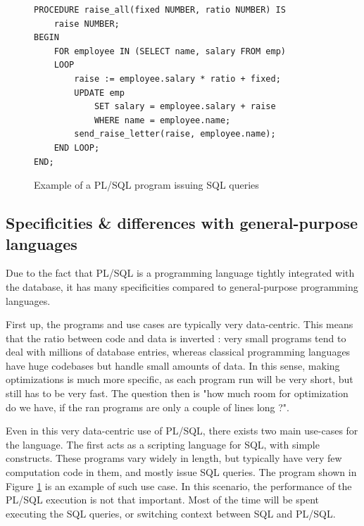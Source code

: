 \documentclass[twoside,11pt,a4paper]{article}
\newcommand{\todo}[1]{\textit{TODO: #1}}
\begin{document}

\begin{figure}[t]
	\begin{lstlisting}[style=PLSQL]
PROCEDURE raise_all(fixed NUMBER, ratio NUMBER) IS
	raise NUMBER;
BEGIN
	FOR employee IN (SELECT name, salary FROM emp)
	LOOP
		raise := employee.salary * ratio + fixed;
		UPDATE emp
			SET salary = employee.salary + raise
			WHERE name = employee.name;
		send_raise_letter(raise, employee.name);
	END LOOP;
END;
	\end{lstlisting}
	
	\caption{Example of a PL/SQL program issuing SQL queries}
	\label{fig:plsraiseall}
\end{figure}


\subsection{Specificities \& differences with general-purpose languages}

Due to the fact that PL/SQL is a programming language tightly integrated with the database, it has many specificities compared to general-purpose programming languages.

First up, the programs and use cases are typically very data-centric. This means that the ratio between code and data is inverted : very small programs tend to deal with millions of database entries, whereas classical programming languages have huge codebases but handle small amounts of data. In this sense, making optimizations is much more specific, as each program run will be very short, but still has to be very fast. The question then is "how much room for optimization do we have, if the ran programs are only a couple of lines long ?".

Even in this very data-centric use of PL/SQL, there exists two main use-cases for the language. The first acts as a scripting language for SQL, with simple constructs. These programs vary widely in length, but typically have very few computation code in them, and mostly issue SQL queries. The program shown in Figure \ref{fig:plsraiseall} is an example of such use case. In this scenario, the performance of the PL/SQL execution is not that important. Most of the time will be spent executing the SQL queries, or switching context between SQL and PL/SQL.
\end{document}
